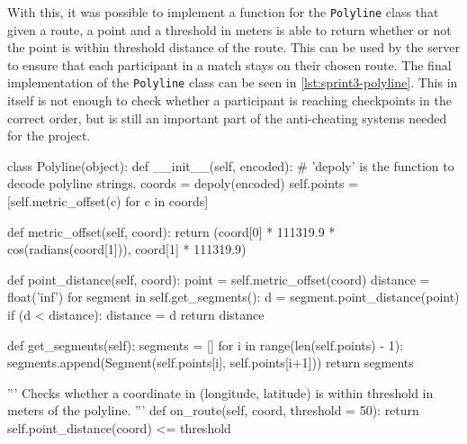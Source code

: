 With this, it was possible to implement a function for the \texttt{Polyline} class that given a route, a point and a threshold in meters is able to return whether or not the point is within threshold distance of the route. This can be used by the server to ensure that each participant in a match stays on their chosen route. The final implementation of the \texttt{Polyline} class can be seen in \autoref{lst:sprint3-polyline}. This in itself is not enough to check whether a participant is reaching checkpoints in the correct order, but is still an important part of the anti-cheating systems needed for the project.

\begin{code}[label={lst:sprint3-polyline}, caption={The Polyline Class.}, language={Python}, style={PythonDoc}]
class Polyline(object):
	def __init__(self, encoded):
		# 'depoly' is the function to decode polyline strings.
		coords = depoly(encoded)
		self.points = [self.metric_offset(c) for c in coords]

	def metric_offset(self, coord):
		return (coord[0] * 111319.9 * cos(radians(coord[1])), coord[1] * 111319.9)

	def point_distance(self, coord):
		point = self.metric_offset(coord)
		distance = float('inf')
		for segment in self.get_segments():
			d = segment.point_distance(point)
			if (d < distance):
			distance = d
		return distance

	def get_segments(self):
		segments = []
		for i in range(len(self.points) - 1):
			segments.append(Segment(self.points[i], self.points[i+1]))
		return segments

	'''
	Checks whether a coordinate in (longitude, latitude) is within threshold in meters of the polyline.
	'''
	def on_route(self, coord, threshold = 50):
		return self.point_distance(coord) <= threshold
\end{code}
